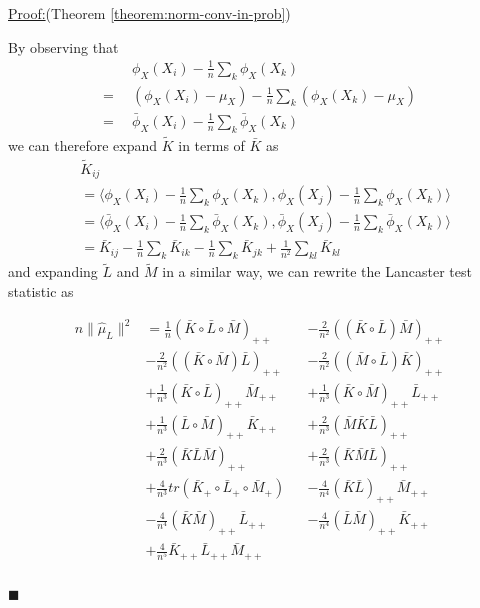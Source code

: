 \documentclass[]{article}
\newenvironment{claimproof}[1]{\par\noindent\underline{Proof:}\space#1}{\hfill $\blacksquare$}
\begin{document}
\begin{claimproof}(Theorem \ref{theorem:norm-conv-in-prob})

By observing that
\begin{align*}
& \phi_X(X_i)- \frac{1}{n}\sum_k\phi_X(X_k) \\
= \enspace&  (\phi_X(X_i) - \mu_X) - \frac{1}{n}\sum_k (\phi_X(X_k) - \mu_X)\\
= \enspace&\bar\phi_X(X_i)- \frac{1}{n}\sum_k\bar\phi_X(X_k)
\end{align*}
we can therefore expand $\tilde{K}$ in terms of $\bar{K}$ as
\begin{align*}
&\tilde{K}_{ij} \\ 
&= \langle\phi_X(X_i)- \frac{1}{n}\sum_k\phi_X(X_k),\phi_X(X_j) - \frac{1}{n}\sum_k\phi_X(X_k)\rangle \\
&= \langle\bar\phi_X(X_i)- \frac{1}{n}\sum_k\bar\phi_X(X_k),\bar\phi_X(X_j) - \frac{1}{n}\sum_k\bar\phi_X(X_k)\rangle \\
&= \bar{K}_{ij} - \frac{1}{n}\sum_k\bar{K}_{ik} - \frac{1}{n}\sum_k\bar{K}_{jk} + \frac{1}{n^2}\sum_{kl}\bar{K}_{kl}
\end{align*}
and expanding $\tilde{L}$ and $\tilde{M}$ in a similar way, we can rewrite the Lancaster test statistic as

\begin{align*} 
n\|\hat \mu_L\|^2 &= 
\frac{1}{n}(\bar{K} \circ \bar{L}\circ \bar{M})_{++} &&-
\frac{2}{n^2}((\bar{K}\circ \bar{L}) \bar{M})_{++} \\&- 
\frac{2}{n^2}((\bar{K} \circ \bar{M}) \bar{L})_{++} &&- 
\frac{2}{n^2}((\bar{M} \circ \bar{L}) \bar{K})_{++} \\&+ 
\frac{1}{n^3}(\bar{K} \circ \bar{L})_{++} \bar{M}_{++} &&+ 
\frac{1}{n^3}(\bar{K} \circ \bar{M})_{++} \bar{L}_{++} \\&+ 
\frac{1}{n^3}(\bar{L} \circ \bar{M})_{++} \bar{K}_{++} &&+ 
\frac{2}{n^3}(\bar{M}\bar{K}\bar{L})_{++} \\&+ 
\frac{2}{n^3}(\bar{K}\bar{L}\bar{M})_{++} &&+ 
\frac{2}{n^3}(\bar{K}\bar{M}\bar{L})_{++} \\&+ 
\frac{4}{n^3}tr(\bar{K}_+ \circ \bar{L}_+ \circ \bar{M}_+) &&-
\frac{4}{n^4}(\bar{K} \bar{L})_{++} \bar{M}_{++} \\& - 
\frac{4}{n^4}(\bar{K}\bar{M})_{++}\bar{L}_{++} &&- 
\frac{4}{n^4}(\bar{L}\bar{M})_{++} \bar{K}_{++} \\&+
\frac{4}{n^5}\bar{K}_{++} \bar{L}_{++} \bar{M}_{++} \\
\end{align*}


\end{claimproof}
\end{document}
